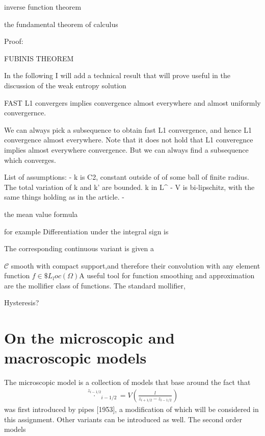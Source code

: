 \begin{definition}
\begin{}
inverse function theorem

the fundamental theorem of calculus

Proof: 

FUBINIS THEOREM 

In the following I will add a technical result that will prove useful in the discussion of the weak entropy solution

FAST L1 convergers implies convergence almost everywhere and almost uniformly convergernce. 

\begin{}

We can always pick a subsequence to obtain fast L1 convergence, and hence L1 convergence almost everywhere. 
Note that it does not hold that L1 converegnce implies almost everywhere convergence. But we can always find a subsequence which converges. 

List of assumptions: 
- k is C2, constant outside of of some ball of finite radius. The total variation of k and k' are bounded. k in L^\infty 
- V is bi-lipschitz, with the same things holding as in the article. 
- 


the mean value formula 

for example
Differentiation under the integral sign is 

The corresponding continuous variant is given a





$\mathscr{C}$
smooth with compact support,and therefore their convolution with any element function $f \in \$L_loc(\Omega)$A useful tool for function smoothing and approximation are the mollifier class of functions. The standard mollifier, 


Hysteresis?



\section{On the microscopic and macroscopic models}



The microscopic model is a collection of models that base around the fact that
\begin{align}
    \overset{z_{i-1/2}}{\cdot}_{i-1/2} = V\left(\frac{l}{z_{i+1/2} - z_{i-1/2}}\right)
\end{align}
was first introduced by pipes [1953], a modification of which will be considered in this assignment. Other variants can be introduced as well. The second order models 


\end{}
\end{}
\end{definition}
